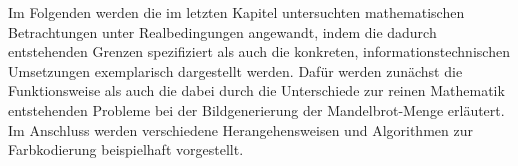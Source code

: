 
Im Folgenden werden die im letzten Kapitel untersuchten mathematischen Betrachtungen
unter Realbedingungen angewandt, indem die dadurch entstehenden Grenzen
spezifiziert als auch die konkreten, informationstechnischen Umsetzungen
exemplarisch dargestellt werden.
Dafür werden zunächst die Funktionsweise als auch die dabei durch die Unterschiede
zur reinen Mathematik entstehenden Probleme bei der Bildgenerierung der
Mandelbrot-Menge erläutert.
Im Anschluss werden verschiedene Herangehensweisen und Algorithmen zur Farbkodierung
beispielhaft vorgestellt.


